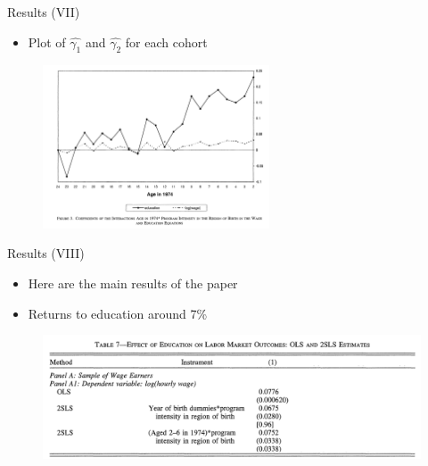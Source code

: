 \documentclass[11pt,notes=hide,aspectratio=169,mathserif]{beamer}
\begin{document}
\begin{frame}{Results (VII)}
\begin{itemize}
\item Plot of $\hat{\gamma_1}$ and $\hat{\gamma_2}$ for each cohort
\end{itemize}
\begin{figure}
    \centering
    \includegraphics[width=0.6\textwidth]{inputs/Figure3.png}
\end{figure}
\end{frame}


\begin{frame}{Results (VIII)}
\begin{itemize}
\item Here are the main results of the paper
\item Returns to education around 7\%
\end{itemize}
\begin{figure}
    \centering
    \includegraphics[width=\textwidth]{inputs/Table7.png}
\end{figure}
\end{frame}
\end{document}
